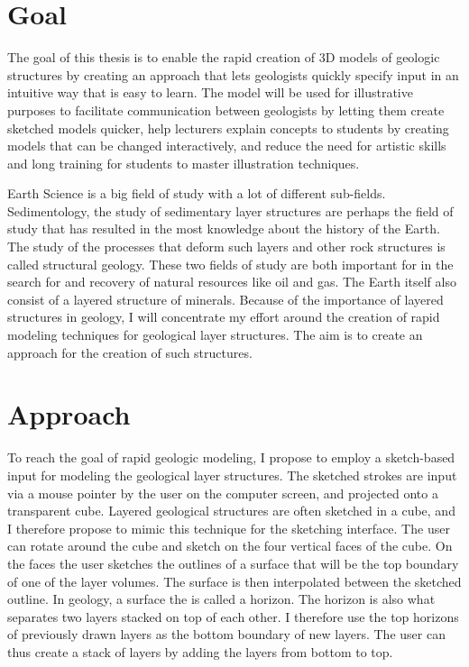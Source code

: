 \documentclass[a4paper,12pt]{report}
\begin{document}
\section{Goal}
The goal of this thesis is to enable the rapid creation of 3D models of geologic structures by creating an approach that lets geologists quickly specify input in an intuitive way that is easy to learn. The model will be used for illustrative purposes to facilitate communication between geologists by letting them create sketched models quicker, help lecturers explain concepts to students by creating models that can be changed interactively, and reduce the need for artistic skills and long training for students to master illustration techniques.

Earth Science is a big field of study with a lot of different sub-fields. Sedimentology, the study of sedimentary layer structures are perhaps the field of study that has resulted in the most knowledge about the history of the Earth. The study of the processes that deform such layers and other rock structures is called structural geology. These two fields of study are both important for in the search for and recovery of natural resources like oil and gas. The Earth itself also consist of a layered structure of minerals. Because of the importance of layered structures in geology, I will concentrate my effort around the creation of rapid modeling techniques for geological layer structures. The aim is to create an approach for the creation of such structures.

\section{Approach}
To reach the goal of rapid geologic modeling, I propose to employ a sketch-based input for modeling the geological layer structures. The sketched strokes are input via a mouse pointer by the user on the computer screen, and projected onto a transparent cube. Layered geological structures are often sketched in a cube, and I therefore propose to mimic this technique for the sketching interface. The user can rotate around the cube and sketch on the four vertical faces of the cube. On the faces the user sketches the outlines of a surface that will be the top boundary of one of the layer volumes. The surface is then interpolated between the sketched outline. In geology, a surface the is called a horizon. The horizon is also what separates two layers stacked on top of each other. I therefore use the top horizons of previously drawn layers as the bottom boundary of new layers. The user can thus create a stack of layers by adding the layers from bottom to top.
\end{document}
